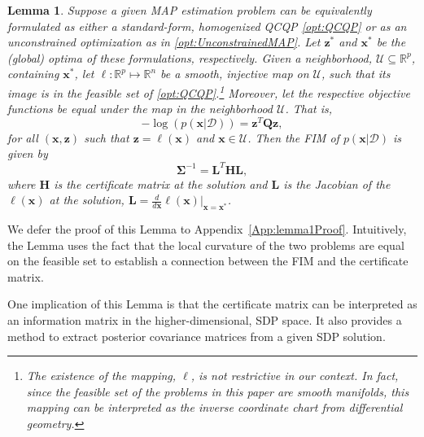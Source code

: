 \documentclass[lettersize,journal]{IEEEtran}
\newtheorem{lemma}[theorem]{Lemma}
\begin{document}
\begin{lemma}\label{lem:FisherInfo}
	Suppose a given MAP estimation problem can be equivalently formulated as either a standard-form, homogenized QCQP \eqref{opt:QCQP} or as an unconstrained optimization as in \eqref{opt:UnconstrainedMAP}. Let $\bm{z}^*$ and $\bm{x}^*$ be the (global) optima of these formulations, respectively. Given a neighborhood, $\mathcal{U} \subseteq \mathbb{R}^p$, containing $\bm{x}^*$, let $\bm{\ell}: \mathbb{R}^p \mapsto \mathbb{R}^n$ be a \emph{smooth, injective} map on $\mathcal{U}$, such that its image is in the feasible set of \eqref{opt:QCQP}.\footnote{The existence of the mapping, $\bm{\ell}$, is not restrictive in our context. In fact, since the feasible set of the problems in this paper are smooth manifolds, this mapping can be interpreted as the \emph{inverse coordinate chart} from differential geometry.} Moreover, let the respective objective functions be equal under the map in the neighborhood $\mathcal{U}$. That is,
	\begin{equation}
		-\log\left(p(\bm{x} \vert \bm{\mathcal{D}})\right) = \bm{z}^T \bm{Q} \bm{z},
	\end{equation}
	for all $(\bm{x}, \bm{z})$ such that $\bm{z}=\bm{\ell}(\bm{x})$ and $\bm{x} \in \mathcal{U}$. Then the FIM of $p(\bm{x} \vert \bm{\mathcal{D}})$ is given by
	\begin{equation}\label{eqn:FIM_H}
		\bm{\Sigma}^{-1}= \bm{L}^T \bm{H}\bm{L},
	\end{equation}
	where $\bm{H}$ is the certificate matrix at the solution and $\bm{L}$ is the Jacobian of the $\bm{\ell}(\bm{x})$ at the solution, $\bm{L} = \frac{d}{d\bm{x}}\bm{\ell}(\bm{x})\vert_{\bm{x}=\bm{x}^*}$. 
\end{lemma}
We defer the proof of this Lemma to Appendix~\ref{App:lemma1Proof}. Intuitively, the Lemma uses the fact that the local curvature of the two problems are equal on the feasible set to establish a connection between the FIM and the certificate matrix. 

One implication of this Lemma is that the certificate matrix can be interpreted as an information matrix in the higher-dimensional, SDP space. It also provides a method to extract posterior covariance matrices from a given SDP solution. 
\end{document}
